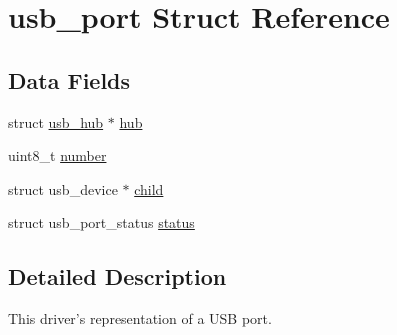 \hypertarget{structusb__port}{\section{usb\-\_\-port Struct Reference}
\label{structusb__port}
}
\subsection*{Data Fields}
\begin{DoxyCompactItemize}
\item 
struct \hyperlink{structusb__hub}{usb\-\_\-hub} $\ast$ \hyperlink{structusb__port_a32a3b6f74c651364bc843206100f5af8}{hub}
\item 
uint8\-\_\-t \hyperlink{structusb__port_ae4ff07e00205ab6051034896b60e211b}{number}
\item 
struct usb\-\_\-device $\ast$ \hyperlink{structusb__port_afad6616803945c9ed1fe0cd7b1d8b612}{child}
\item 
struct usb\-\_\-port\-\_\-status \hyperlink{structusb__port_a761cbd419f28cb6ee0f1d2668a55e11a}{status}
\end{DoxyCompactItemize}


\subsection{Detailed Description}
This driver's representation of a U\-S\-B port. 

